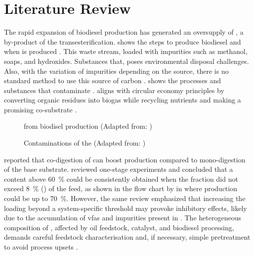 \chapter{Literature Review}
\label{ch:literature_review}

The rapid expansion of biodiesel production has generated an oversupply of , a by-product of the transesterification.  shows the steps to produce biodiesel and when  is produced \parencite{garlapati2016}. This waste stream, loaded with impurities such as methanol, soaps, and hydroxides. Substances that, poses environmental disposal challenges. Also, with the variation of impurities depending on the source, there is no standard method to use this source of carbon \parencite{anand2012, gebreegziabher2025}.  shows the processes and substances that contaminate .  aligns with circular economy principles by converting organic residues into biogas while recycling nutrients and making  a promising co-substrate \parencite{gebreegziabher2025}.

\begin{figure}[H]
    \centering
    \resizebox{0.65\textwidth}{!}{%
        
    }
    \caption{ from biodisel production (Adapted from: \textcite{garlapati2016})}
    \label{graph:gl-prod}
\end{figure}

\begin{figure}[H]
    \centering
    \resizebox{\textwidth}{!}{%
        
    }
    \caption{Contaminations of the  (Adapted from: \textcite{attarbachi2023})}
    \label{graph:gl-imp}
\end{figure}

\textcite{gebreegziabher2025} reported that co-digestion of  can boost  production compared to mono-digestion of the base substrate. \textcite{tomczak2025} reviewed one-stage  experiments and concluded that a  content above \qty{60}{\percent} could be consistently obtained when the  fraction did not exceed \qty{8}{\percent} () of the feed, as shown in the flow chart by \textcite{li2011} in  where  production could be up to \qty{70}{\percent}. However, the same review emphasized that increasing the  loading beyond a system-specific threshold may provoke inhibitory effects, likely due to the accumulation of \glspl{vfa} and impurities present in  \parencite{anand2012, tomczak2025}. The heterogeneous composition of , affected by oil feedstock, catalyst, and biodiesel processing, demands careful feedstock characterisation and, if necessary, simple pretreatment to avoid process upsets \parencite{attarbachi2023}.

